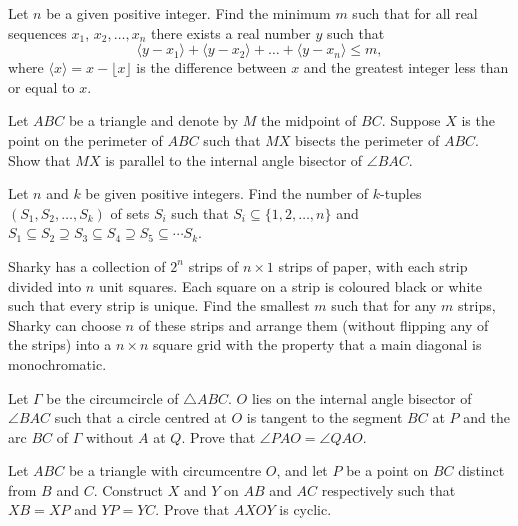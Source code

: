 \documentclass[10pt,a4paper]{scrartcl}
\begin{document}
	\begin{prob}%
		Let \(n\) be a given positive integer. Find the minimum \(m\) such that for all real sequences \(x_1\), \(x_2, \dots, x_n\) there exists a real number \(y\) such that \[\langle y - x_1 \rangle + \langle y - x_2 \rangle + \dots + \langle y - x_n \rangle \leq m,\] where \(\langle x \rangle = x - \lfloor x \rfloor\) is the difference between \(x\) and the greatest integer less than or equal to \(x\).
	\end{prob}

	\begin{prob}%
	Let \(ABC\) be a triangle and denote by \(M\) the midpoint of \(BC\). Suppose \(X\) is the point on the perimeter of \(ABC\) such that \(MX\) bisects the perimeter of \(ABC\). Show that \(MX\) is parallel to the internal angle bisector of \(\angle BAC\).
	\end{prob}

	\begin{prob}%
	Let \(n\) and \(k\) be given positive integers.  Find the number of \(k\)-tuples \((S_1, S_2, \dots, S_k)\) of sets \(S_i\) such that \(S_i \subseteq \{1, 2, \dots, n\}\) and \(S_1 \subseteq S_2 \supseteq S_3 \subseteq S_4 \supseteq S_5 \subseteq \cdots S_k\).
	\end{prob}

	\begin{prob}%
	Sharky has a collection of \(2^n\) strips of \(n \times 1\) strips of paper, with each strip divided into \(n\) unit squares. Each square on a strip is coloured black or white such that every strip is unique. Find the smallest \(m\) such that for any \(m\) strips, Sharky can choose \(n\) of these strips and arrange them (without flipping any of the strips) into a \(n \times n\) square grid with the property that a main diagonal is monochromatic.
	\end{prob}

	\begin{prob}%
	Let $\Gamma$ be the circumcircle of $\triangle ABC$. \(O\) lies on the internal angle bisector of \(\angle BAC\) such that a circle centred at $O$ is tangent to the segment $BC$ at $P$ and the arc $BC$ of $\Gamma$ without $A$ at $Q$. Prove that $\angle PAO = \angle QAO$.
	\end{prob}

	\begin{prob}%
	Let \(ABC\) be a triangle with circumcentre \(O\), and let \(P\) be a point on \(BC\) distinct from \(B\) and \(C\). Construct \(X\) and \(Y\) on \(AB\) and \(AC\) respectively such that \(XB = XP\) and \(YP = YC\). Prove that \(AXOY\) is cyclic.
	\end{prob}
\end{document}
